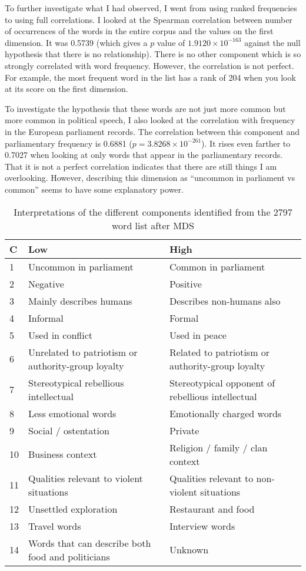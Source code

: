 To further investigate what I had observed, I went from using ranked frequencies 
to using full correlations. I looked at the Spearman correlation between number 
of occurrences of the words in the entire corpus and the values on the first 
dimension. It was 0.5739 (which gives a $p$ value of $1.9120 \times 10^{-163}$ 
against the null hypothesis that there is no relationship). There is no other 
component which is so strongly correlated with word frequency. However, the 
correlation is not perfect. For example, the most frequent word in the list has 
a rank of 204 when you look at its score on the first dimension.

To investigate the hypothesis that these words are not just more common but more 
common in political speech, I also looked at the correlation with frequency in 
the European parliament records. The correlation between this component and 
parliamentary frequency is 0.6881 ($p=3.8268 \times 10^{-261}$).  It rises even 
farther to 0.7027 when looking at only words that appear in the parliamentary 
records. That it is not a perfect correlation indicates that there are still 
things I am overlooking. However, describing this dimension as ``uncommon in 
parliament vs common'' seems to have some explanatory power.

\begin{table}[tbp]
\begin{tabular}{ | l |p{2in}|p{2in}|}
 \hline
 C & Low & High \\
 \hline
 1 & Uncommon in parliament & Common in parliament\\
 2 & Negative & Positive\\
 3 & Mainly describes humans & Describes non-humans also \\
 4 & Informal & Formal \\
 5 & Used in conflict & Used in peace \\
 6 & Unrelated to patriotism or authority-group loyalty & Related to 
     patriotism or authority-group loyalty \\
 7 & Stereotypical rebellious intellectual & Stereotypical opponent of 
     rebellious intellectual \\
 8 & Less emotional words & Emotionally charged words \\
 9 & Social / ostentation & Private  \\
 10 & Business context & Religion / family / clan context \\
 11 & Qualities relevant to violent situations & Qualities relevant to 
       non-violent situations \\
 12 & Unsettled exploration & Restaurant and food \\
 13 & Travel words & Interview words \\
 14 & Words that can describe both food and politicians &  Unknown \\
 \hline
\end{tabular}
 \caption{Interpretations of the different components identified from the 2797
 word list after MDS}
 \label{tab:2797mdsinterp}
\end{table}

